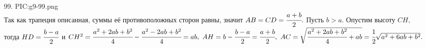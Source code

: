99. {{PIC:g9-99.png}}\\
Так как трапеция описанная, суммы её противоположных сторон равны, значит $AB=CD=\cfrac{a+b}{2}.$ Пусть $b>a.$ Опустим высоту $CH,$ тогда $HD=\cfrac{b-a}{2}$ и $CH^2=\cfrac{a^2+2ab+b^2}{4}-\cfrac{a^2-2ab+b^2}{4}=ab,\ AH=b-\cfrac{b-a}{2}=\cfrac{a+b}{2},\ AC=\sqrt{\cfrac{a^2+2ab+b^2}{4}+ab}=\cfrac{1}{2}\sqrt{a^2+6ab+b^2}.$\newpage\noindent
